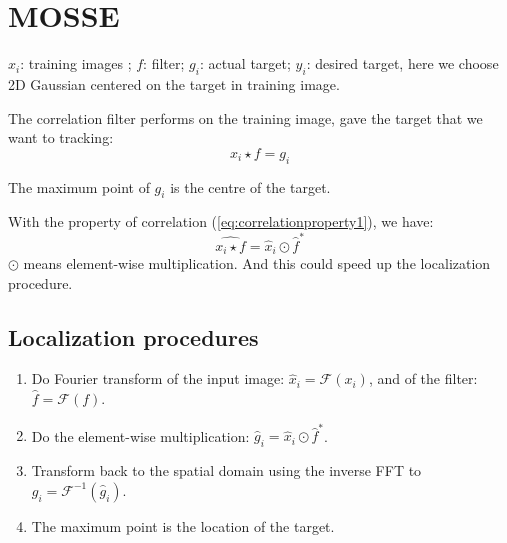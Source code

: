 \documentclass[12pt]{article}
\numberwithin{equation}{section}
\begin{document}
\section{MOSSE \cite{bolme2010visual}}
$x_i$: training images ; $f$: filter; $g_i$: actual target; $y_i$: desired target, here we choose 2D Gaussian centered on the target in training image. \par
The correlation filter performs on the training image, gave the target that we want to tracking:
\begin{equation}
	x_i \star f = g_i
\end{equation}\par
The maximum point of $g_i$ is the centre of the target. \par
With the property of correlation (\ref{eq:correlationproperty1}), we have:
\begin{equation}
	\widehat{x_i \star f} = \hat{x}_i \odot \hat{f}^*
\end{equation}
$\odot$ means element-wise multiplication. And this could speed up the localization procedure.\par
\subsection{Localization procedures}
\begin{enumerate}
	\item Do Fourier transform of the input image: $\hat{x}_i=\mathcal{F}(x_i)$, and of the filter: $\hat{f}=\mathcal{F}(f)$. \par
	\item Do the element-wise multiplication: $\hat{g}_i =\hat{x}_i \odot \hat{f}^*$. \par
	\item Transform back to the spatial domain using the inverse FFT to $g_i=\mathcal{F}^{-1}(\hat{g}_i)$. \par
	\item The maximum point is the location of the target.
\end{enumerate}
\end{document}
